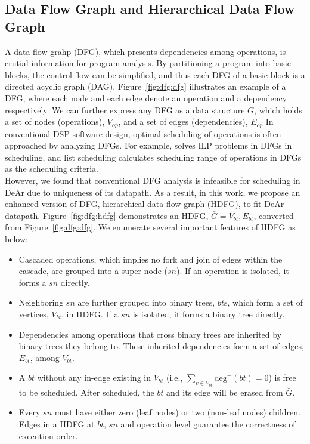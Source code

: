         \subsection{Data Flow Graph and Hierarchical Data Flow Graph}
        \label{sec:hdfg}
            A data flow grahp (DFG), which presents dependencies among operations, is crutial information for program analysis.
            By partitioning a program into basic blocks, the control flow can be simplified, and thus each DFG of a basic block is a directed acyclic graph (DAG).
            Figure~\ref{fig:dfg:dfg} illustrates an example of a DFG, where each node and each edge denote an operation and a dependency respectively.
            We can further express any DFG as a data structure $G$, which holds a set of nodes (operations), $V_{op}$, and a set of edges (dependencies), $E_{op}$
            In conventional DSP software design, optimal scheduling of operations is often approached by analyzing DFGs.
            For example, \cite{dsplite} solves ILP problems \cite{ilp} in DFGs in scheduling, 
            and list scheduling \cite{list} calculates scheduling range of operations in DFGs as the scheduling criteria. 
            \\\indent
            However, we found that conventional DFG analysis is infeasible for scheduling in DeAr due to uniqueness of its datapath.
            As a result, in this work, we propose an enhanced version of DFG, hierarchical data flow graph (HDFG), to fit DeAr datapath.
            Figure~\ref{fig:dfg:hdfg} demonstrates an HDFG, $\bar{G} = {V_{bt}, E_{bt}}$, converted from Figure~\ref{fig:dfg:dfg}.
            We enumerate several important features of HDFG as below: 
            \begin{itemize}
                \item Cascaded operations, which implies no fork and join of edges within the cascade, are grouped into a super node ($sn$). 
                      If an operation is isolated, it forms a $sn$ directly.
                \item Neighboring $sn$ are further grouped into binary trees, $bt$s, which form a set of vertices, $V_{bt}$, in HDFG.
                      If a $sn$ is isolated, it forms a binary tree directly.
                \item Dependencies among operations that cross binary trees are inherited by binary trees they belong to.
                      These inherited dependencies form a set of edges, $E_{bt}$, among $V_{bt}$.
                \item A $bt$ without any in-edge existing in $V_{bt}$ (i.e., $\sum_{v \in V_{bt}}\textrm{deg}^-(bt) = 0$) is free to be scheduled. 
                      After scheduled, the $bt$ and its edge will be erased from $\bar{G}$.
                \item Every $sn$ must have either zero (leaf nodes) or two (non-leaf nodes) children.
                      Edges in a HDFG at $bt$, $sn$ and operation level guarantee the correctness of execution order.
            \end{itemize}
